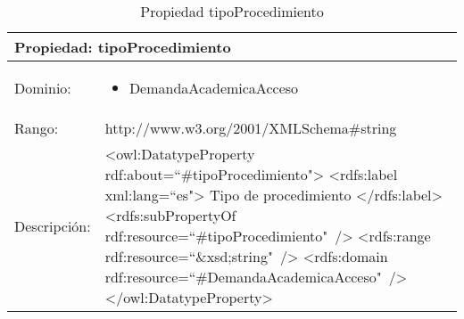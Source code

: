\begin{table}[!ht]
	\centering
	\begin{tabular}{|p{}|p{}|}
		\hline
		\multicolumn{2}{|l|}{Propiedad: \textbf{tipoProcedimiento}}
		\\ \hline
		Dominio:&
		\begin{itemize}
			\item DemandaAcademicaAcceso
		\end{itemize}
		\\ \hline
		Rango:&
		http://www.w3.org/2001/XMLSchema\#string
		\\ \hline
		Descripción:&
		\textless owl:DatatypeProperty rdf:about=``\#tipoProcedimiento"\textgreater\newline 
		\tab\textless rdfs:label xml:lang=``es"\textgreater\newline
		\tab\tab Tipo de procedimiento\newline
		\tab\textless /rdfs:label\textgreater\newline
		\tab\textless rdfs:subPropertyOf\newline
		\tab\tab rdf:resource=``\#tipoProcedimiento"\ /\textgreater\newline
		\tab\textless rdfs:range\newline
		\tab\tab rdf:resource=``\&xsd;string"\ /\textgreater\newline
		\tab\textless rdfs:domain\newline
		\tab\tab rdf:resource=``\#DemandaAcademicaAcceso"\ /\textgreater\newline
		\textless /owl:DatatypeProperty\textgreater
		\\ \hline
	\end{tabular}
	\caption{Propiedad tipoProcedimiento}
	\label{propiedad-tipoprocedimiento}
\end{table}

